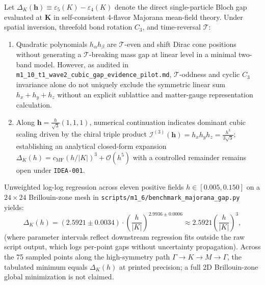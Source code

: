 \begin{proposition}
\label{thm:m1_6_cubic_gap}
Let $\Delta_K(\mathbf{h}) \equiv \varepsilon_5(K) - \varepsilon_4(K)$ denote the direct single-particle Bloch gap evaluated at $\mathbf{K}$ in self-consistent 4-flavor Majorana mean-field theory. Under spatial inversion, threefold bond rotation $C_3$, and time-reversal $\mathcal{T}$:
\begin{enumerate}
\item Quadratic polynomials $h_\alpha h_\beta$ are $\mathcal{T}$-even and shift Dirac cone positions without generating a $\mathcal{T}$-breaking mass gap at linear level in a minimal two-band model. However, as audited in \texttt{m1\_10\_t1\_wave2\_cubic\_gap\_evidence\_pilot.md}, $\mathcal{T}$-oddness and cyclic $C_3$ invariance alone do not uniquely exclude the symmetric linear sum $h_x + h_y + h_z$ without an explicit sublattice and matter-gauge representation calculation.
\item Along $\mathbf{h} = \frac{h}{\sqrt{3}}(1, 1, 1)$, numerical continuation indicates dominant cubic scaling driven by the chiral triple product $\mathcal{I}^{(3)}(\mathbf{h}) = h_x h_y h_z = \frac{h^3}{3\sqrt{3}}$; establishing an analytical closed-form expansion $\Delta_K(h) = c_{\mathrm{MF}} (h/|K|)^3 + \mathcal{O}(h^5)$ with a controlled remainder remains open under \texttt{IDEA-001}.
\end{enumerate}
\end{proposition}

\begin{proposition}
\label{prop:m1_6_cubic_gap_fit}
Unweighted log-log regression across eleven positive fields $h \in [0.005, 0.150]$ on a $24 \times 24$ Brillouin-zone mesh in \texttt{scripts/m1\_6/benchmark\_majorana\_gap.py} yields:
\begin{equation}
\label{eq:m1_6_cubic_fit}
\Delta_K(h) = (2.5921 \pm 0.0034) \cdot \left(\frac{h}{|K|}\right)^{2.9936 \pm 0.0006} \approx 2.5921 \left(\frac{h}{|K|}\right)^3,
\end{equation}
(where parameter intervals reflect downstream regression fits outside the raw script output, which logs per-point gaps without uncertainty propagation). Across the 75 sampled points along the high-symmetry path $\Gamma \to K \to M \to \Gamma$, the tabulated minimum equals $\Delta_K(h)$ at printed precision; a full 2D Brillouin-zone global minimization is not claimed.
\end{proposition}

